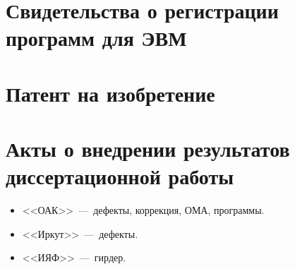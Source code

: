 \chapter{Свидетельства о регистрации программ для ЭВМ} 






\chapter{Патент на изобретение} 


\chapter{Акты о внедрении результатов диссертационной работы} 

\begin{itemize}
	\item <<ОАК>>~---~дефекты, коррекция, ОМА, программы.
	\item <<Иркут>>~---~дефекты.
	\item <<ИЯФ>>~---~гирдер.
\end{itemize}
